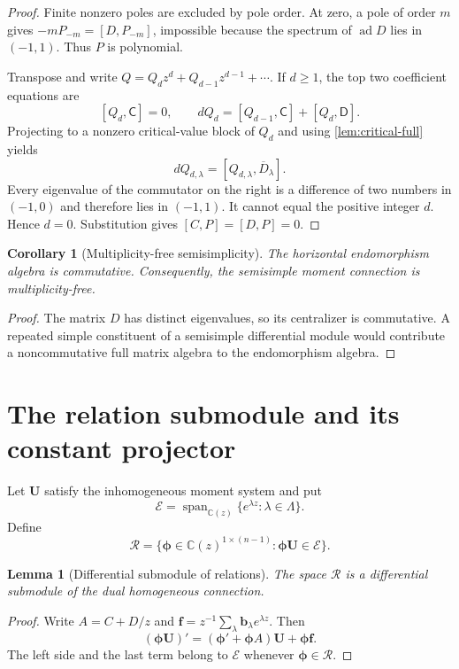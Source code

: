\documentclass[11pt]{article}
\numberwithin{equation}{section}
\newtheorem{lemma}[theorem]{Lemma}
\newtheorem{corollary}[theorem]{Corollary}
\theoremstyle{definition}
\theoremstyle{remark}
\newcommand{\C}{\mathbb C}
\newcommand{\Span}{\operatorname{span}}
\newcommand{\Ecal}{\mathcal E}
\newcommand{\Rcal}{\mathcal R}
\begin{document}
\begin{proof}
Finite nonzero poles are excluded by pole order.  At zero, a pole of order
$m$ gives $-mP_{-m}=[D,P_{-m}]$, impossible because the spectrum of
$\operatorname{ad}D$ lies in $(-1,1)$.  Thus $P$ is polynomial.

Transpose and write $Q=Q_d z^d+Q_{d-1} z^{d-1}+\cdots$.  If $d\ge1$, the top
two coefficient equations are
\[
  [Q_d,\mathsf C]=0,
  \qquad
  dQ_d=[Q_{d-1},\mathsf C]+[Q_d,\mathsf D].
\]
Projecting to a nonzero critical-value block of $Q_d$ and using
\cref{lem:critical-full} yields
\[
  dQ_{d,\lambda}=[Q_{d,\lambda},\overline D_\lambda].
\]
Every eigenvalue of the commutator on the right is a difference of two
numbers in $(-1,0)$ and therefore lies in $(-1,1)$.  It cannot equal the
positive integer $d$.  Hence $d=0$.  Substitution gives
$[C,P]=[D,P]=0$.
\end{proof}

\begin{corollary}[Multiplicity-free semisimplicity]
The horizontal endomorphism algebra is commutative.  Consequently, the
semisimple moment connection is multiplicity-free.
\end{corollary}

\begin{proof}
The matrix $D$ has distinct eigenvalues, so its centralizer is commutative.
A repeated simple constituent of a semisimple differential module would
contribute a noncommutative full matrix algebra to the endomorphism algebra.
\end{proof}

\section{The relation submodule and its constant projector}

Let $\mathbf U$ satisfy the inhomogeneous moment system and put
\[
  \Ecal=\Span_{\C(z)}\{e^{\lambda z}:\lambda\in\Lambda\}.
\]
Define
\[
  \Rcal=
  \{\boldsymbol\phi\in\C(z)^{1\times(n-1)}:
    \boldsymbol\phi\mathbf U\in\Ecal\}.
\]

\begin{lemma}[Differential submodule of relations]
The space $\Rcal$ is a differential submodule of the dual homogeneous
connection.
\end{lemma}

\begin{proof}
Write $A=C+D/z$ and
$\mathbf f=z^{-1}\sum_\lambda\mathbf b_\lambda e^{\lambda z}$.  Then
\[
  (\boldsymbol\phi\mathbf U)'
  =(\boldsymbol\phi'+\boldsymbol\phi A)\mathbf U
   +\boldsymbol\phi\mathbf f.
\]
The left side and the last term belong to $\Ecal$ whenever
$\boldsymbol\phi\in\Rcal$.
\end{proof}
\end{document}
